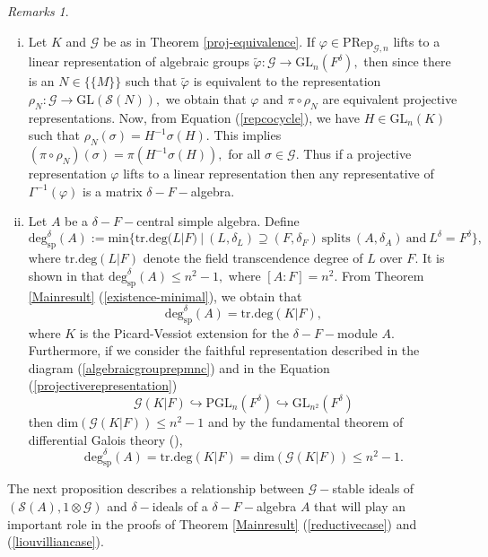 \documentclass[preprint, 11pt]{amsart}
\theoremstyle{corollary}
\theoremstyle{remark}
\newtheorem*{remarks*}{Remarks}
\theoremstyle{proposition}
\numberwithin{equation}{subsection}
\begin{document}
\begin{remarks*}
\begin{enumerate}[(i)]
		\item  Let $K$ and $\mathscr G$ be as in Theorem \ref{proj-equivalence}. If $\varphi\in \mathrm{PRep}_{\mathscr G, n}$ lifts to a linear representation of algebraic groups $\tilde{\varphi}: \mathscr G\to \mathrm{GL}_n(F^\delta),$ then since  there is an $N\in \{\{M\}\}$  such that $\tilde{\varphi}$ is equivalent to the representation $\rho_N: \mathscr G\to \mathrm{GL}(\mathscr S(N)),$ we obtain that $\varphi$ and $\pi\circ \rho_N$ are equivalent projective representations. Now, from Equation (\ref{repcocycle}), we have  $H\in \mathrm{GL}_n(K)$ such that $\rho_N(\sigma)=H^{-1}\sigma(H).$ This implies $(\pi\circ \rho_N)(\sigma)=\pi(H^{-1}\sigma(H)),$ for all $\sigma\in \mathscr G.$ Thus if a projective representation $\varphi$  lifts to a linear representation then any representative of $\Gamma^{-1}(\varphi)$ is a matrix $\delta-F-$algebra. \\
		

		\item Let $A$ be a $\delta-F-$central simple algebra.  Define $$\mathrm{deg}^{\delta}_{\mathrm{sp}}(A):= \mathrm{min}\{\mathrm{tr.deg}(L|F)\ | \ (L, \delta_L)\supseteq (F, \delta_F) \ \text{splits}\ (A, \delta_A)\ \text{and}\ L^{\delta}=F^{\delta}\},$$ where $\mathrm{tr.deg}(L|F)$ denote the field transcendence degree of $L$ over $F.$   It is shown in \cite[Corollary 5.2]{tsui-wang} that $\mathrm{deg}^{\delta}_{\mathrm{sp}}(A)\leq n^2-1,$ where $[A: F]=n^2.$ From Theorem \ref{Mainresult} (\ref{existence-minimal}), we obtain that $$\mathrm{deg}^{\delta}_{\mathrm{sp}}(A)=\mathrm{tr.deg}(K|F),$$ where $K$ is the Picard-Vessiot extension for the $\delta-F-$module $A.$  Furthermore, if we  consider the faithful representation described in the  diagram (\ref{algebraicgrouprepmnc}) and in the Equation (\ref{projectiverepresentation})
		 $$\mathscr{G}(K|F)\hookrightarrow \mathrm{PGL}_n(F^\delta)\hookrightarrow \mathrm{GL}_{n^2}(F^{\delta})$$ then $\mathrm{dim}(\mathscr G(K|F))\leq n^2-1$ and  by the fundamental theorem of differential Galois theory (\cite[Corollary 1.30]{MvdP03}),  $$\mathrm{deg}^{\delta}_{\mathrm{sp}}(A)=\mathrm{tr.deg}(K|F)=\mathrm{dim}(\mathscr{G}(K|F))\leq n^2-1.$$ 
		 \end{enumerate}
		\end{remarks*}
	
	
	


The next proposition describes a relationship  between $\mathscr{G}-$stable ideals of $(\mathscr S(A), 1\otimes \mathscr{G})$ and $\delta-$ideals of a $\delta-F-$algebra $A$ that will play an important role in the proofs of Theorem \ref{Mainresult} (\ref{reductivecase}) and (\ref{liouvilliancase}).
\end{document}
